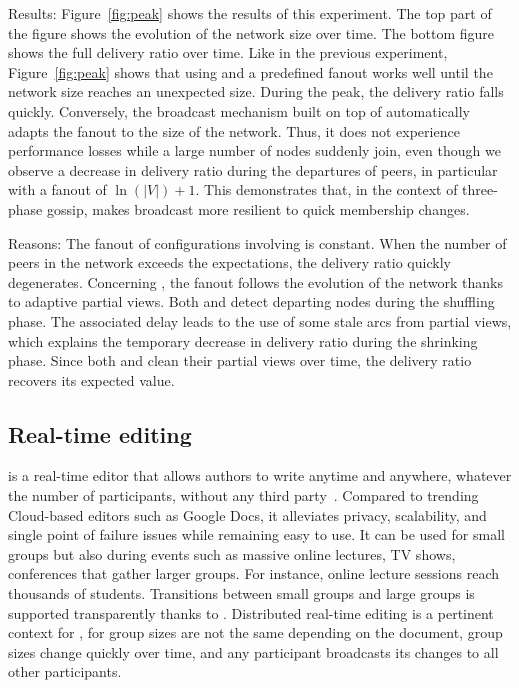 \begin{asparadesc}
\item [Results:] Figure~\ref{fig:peak} shows the results of this
  experiment. The top part of the figure shows the evolution of the
  network size over time. The bottom figure shows the full delivery
  ratio over time. Like in the previous experiment,
  Figure~\ref{fig:peak} shows that using \CYCLON and a predefined
  fanout works well until the network size reaches an unexpected
  size. During the peak, the delivery ratio falls quickly. Conversely,
  the broadcast mechanism built on top of \SPRAY automatically adapts
  the fanout to the size of the network. Thus, it does not experience
  performance losses while a large number of nodes suddenly join, even
  though we observe a decrease in delivery ratio during the departures
  of peers, in particular with a fanout of $\ln(|V|)+1$. This
  demonstrates that, in the context of three-phase gossip, \SPRAY
  makes broadcast more resilient to quick membership changes.
\item [Reasons:] The fanout of configurations involving \CYCLON is
  constant. When the number of peers in the network exceeds the
  expectations, the delivery ratio quickly degenerates. Concerning
  \SPRAY, the fanout follows the evolution of the network thanks to
  adaptive partial views. Both \SPRAY and \CYCLON detect departing
  nodes during the shuffling phase. The associated delay leads to the
  use of some stale arcs from partial views, which explains the
  temporary decrease in delivery ratio during the shrinking
  phase. Since both \CYCLON and \SPRAY clean their partial views over
  time, the delivery ratio recovers its expected value.
\end{asparadesc}


\subsection{Real-time editing}

\CRATE is a real-time editor that allows authors to write anytime and anywhere,
whatever the number of participants, without any third
party~\cite{nedelec2016crate}. Compared to trending Cloud-based editors such as
Google Docs, it alleviates privacy, scalability, and single point of failure
issues while remaining easy to use.  It can be used for small groups but also
during events such as massive online lectures, TV shows, conferences that gather
larger groups. For instance, online lecture sessions reach thousands of
students. Transitions between small groups and large groups is supported
transparently thanks to \SPRAY. Distributed real-time editing is a pertinent
context for \SPRAY, for group sizes are not the same depending on the document,
group sizes change quickly over time, and any participant broadcasts its changes
to all other participants.

